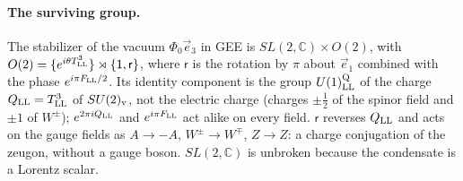 \documentclass[aps,prd,onecolumn,superscriptaddress,nofootinbib,floatfix,longbibliography]{revtex4-2}
\newcommand{\LL}{{\rm LL}}
\begin{document}
\paragraph*{The surviving group.}
The stabilizer of the vacuum $\Phi_0\vec e_3$ in GEE is $SL(2,\mathbb C)\times O(2)$, with
$O(2)=\{e^{i\theta T^3_\LL}\}\rtimes\{\mathsf 1,\mathsf r\}$, where $\mathsf r$ is the rotation by $\pi$ about $\vec e_1$ combined with the phase
$e^{i\pi F_\LL/2}$. Its identity component is the group $U(1)^{\rm Q}_\LL$ of the charge $Q_\LL=T^3_\LL$ of $SU(2)_{\rm v}$, not the electric
charge (charges $\pm\frac12$ of the spinor field and $\pm1$ of $W^\pm$); $e^{2\pi iQ_\LL}$ and $e^{i\pi F_\LL}$ act alike on every field. $\mathsf r$ reverses $Q_\LL$
and acts on the gauge fields as $A\to-A$, $W^\pm\to W^\mp$, $Z\to Z$: a charge conjugation of the zeugon, without a gauge boson.
$SL(2,\mathbb C)$ is unbroken because the condensate is a Lorentz scalar.
\end{document}

